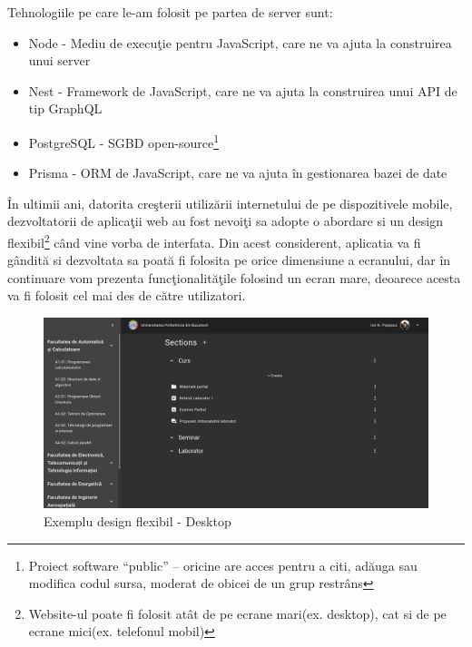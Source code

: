 \documentclass[12pt, a4paper, oneside, romanian]{teza-upb}
\begin{document}
Tehnologiile pe care le-am folosit pe partea de server sunt:
\begin{itemize}
	\item Node - Mediu de execuţie pentru JavaScript, care ne va ajuta la construirea unui server
	\item Nest - Framework de JavaScript, care ne va ajuta la construirea unui API de tip GraphQL
	\item PostgreSQL - SGBD open-source\footnote{Proiect software ``public'' -- oricine are acces pentru a citi, adăuga sau modifica codul sursa, moderat de obicei de un grup restrâns}
	\item Prisma - ORM de JavaScript, care ne va ajuta în gestionarea bazei de date
\end{itemize}

În ultimii ani, datorita creşterii utilizării internetului de pe dispozitivele mobile, dezvoltatorii de aplicaţii web au fost nevoiţi sa adopte o abordare si un design flexibil\footnote{Website-ul poate fi folosit atât de pe ecrane mari(ex. desktop), cat si de pe ecrane mici(ex. telefonul mobil)} când vine vorba de interfata. Din acest considerent, aplicatia va fi gândită si dezvoltata sa poată fi folosita pe orice dimensiune a ecranului, dar în continuare vom prezenta funcţionalităţile folosind un ecran mare, deoarece acesta va fi folosit cel mai des de către utilizatori.

\begin{figure}[H]
\centering
\includegraphics*[width=\columnwidth]{exemplu-design-responsive-desktop}
\caption{Exemplu design flexibil - Desktop}
\label{exemplu-design-responsive-desktop}
\end{figure}
\end{document}
